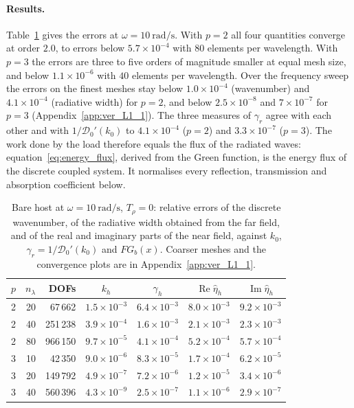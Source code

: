 {\paragraph{Results.} Table~\ref{tab:num_L1_1} gives the errors at $\omega=10~\si{\radian\per\second}$. With $p=2$ all four quantities converge at order $2.0$, to errors below $5.7\times10^{-4}$ with $80$ elements per wavelength. With $p=3$ the errors are three to five orders of magnitude smaller at equal mesh size, and below $1.1\times10^{-6}$ with $40$ elements per wavelength. Over the frequency sweep the errors on the finest meshes stay below $1.0\times10^{-4}$ (wavenumber) and $4.1\times10^{-4}$ (radiative width) for $p=2$, and below $2.5\times10^{-8}$ and $7\times10^{-7}$ for $p=3$ (Appendix~\ref{app:ver_L1_1}). The three measures of $\gamma_r$ agree with each other and with $1/\mathcal{D}_0'(k_0)$ to $4.1\times10^{-4}$ ($p=2$) and $3.3\times10^{-7}$ ($p=3$). The work done by the load therefore equals the flux of the radiated waves: equation~\eqref{eq:energy_flux}, derived from the Green function, is the energy flux of the discrete coupled system. It normalises every reflection, transmission and absorption coefficient below.

\begin{table}[t]
    \centering
    \caption{Bare host at $\omega=10~\si{\radian\per\second}$, $T_\rho=0$: relative errors of the discrete wavenumber, of the radiative width obtained from the far field, and of the real and imaginary parts of the near field, against $k_0$, $\gamma_r=1/\mathcal{D}_0'(k_0)$ and $FG_b(x)$. Coarser meshes and the convergence plots are in Appendix~\ref{app:ver_L1_1}.}
    \label{tab:num_L1_1}
    \footnotesize
    \begin{tabular}{rrrcccc}
        \hline
        $p$ & $n_\lambda$ & DOFs & $k_h$ & $\gamma_h$ & $\operatorname{Re}\widehat{\eta}_h$ & $\operatorname{Im}\widehat{\eta}_h$ \\
        \hline
        2 & 20 & 67\,662  & $1.5\times10^{-3}$ & $6.4\times10^{-3}$ & $8.0\times10^{-3}$ & $9.2\times10^{-3}$ \\
        2 & 40 & 251\,238 & $3.9\times10^{-4}$ & $1.6\times10^{-3}$ & $2.1\times10^{-3}$ & $2.3\times10^{-3}$ \\
        2 & 80 & 966\,150 & $9.7\times10^{-5}$ & $4.1\times10^{-4}$ & $5.2\times10^{-4}$ & $5.7\times10^{-4}$ \\
        3 & 10 & 42\,350  & $9.0\times10^{-6}$ & $8.3\times10^{-5}$ & $1.7\times10^{-4}$ & $6.2\times10^{-5}$ \\
        3 & 20 & 149\,792 & $4.9\times10^{-7}$ & $7.2\times10^{-6}$ & $1.2\times10^{-5}$ & $3.4\times10^{-6}$ \\
        3 & 40 & 560\,396 & $4.3\times10^{-9}$ & $2.5\times10^{-7}$ & $1.1\times10^{-6}$ & $2.9\times10^{-7}$ \\
        \hline
    \end{tabular}
\end{table}

}
